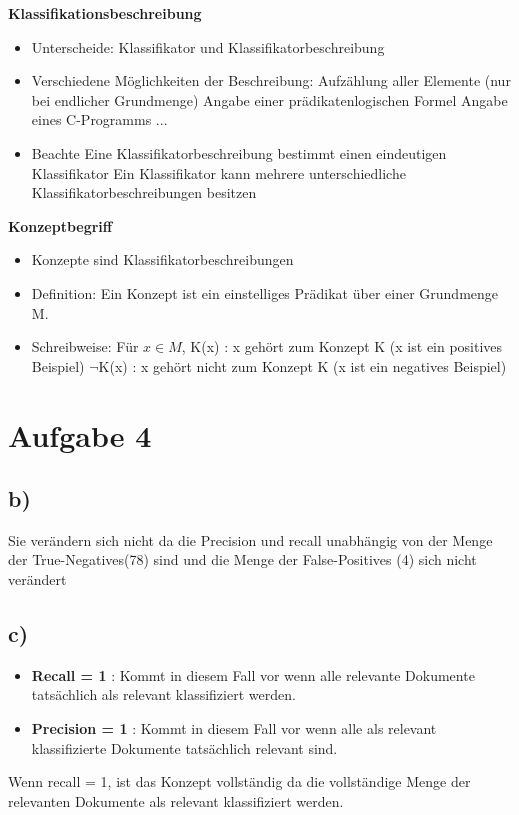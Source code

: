 \documentclass[11pt,a4paper,parskip=half ]{scrartcl}
\begin{document}
			\textbf{Klassifikationsbeschreibung}
			\begin{itemize}
				\item Unterscheide: Klassifikator und Klassifikatorbeschreibung
				\item Verschiedene Möglichkeiten der Beschreibung:
					\subitem Aufzählung aller Elemente (nur bei endlicher Grundmenge)
					\subitem Angabe einer prädikatenlogischen Formel
					\subitem Angabe eines C-Programms
					\subitem ...
				\item Beachte
					\subitem Eine Klassifikatorbeschreibung bestimmt einen eindeutigen Klassifikator
					\subitem  Ein Klassifikator kann mehrere unterschiedliche Klassifikatorbeschreibungen besitzen 
			\end{itemize}
		
			\textbf{Konzeptbegriff}
			\begin{itemize}
				\item Konzepte sind Klassifikatorbeschreibungen
				\item Definition: Ein Konzept ist ein einstelliges Prädikat über einer Grundmenge M.
				\item Schreibweise:
					\subitem Für $x\in M$,  
					\subsubitem  K(x) : x gehört zum Konzept K (x ist ein positives Beispiel)
					\subsubitem $\neg$K(x) : x gehört nicht zum Konzept K (x ist ein negatives Beispiel)
			\end{itemize}
		
	
	\section*{Aufgabe 4}
	\subsection*{b)} Sie verändern sich nicht da die Precision und recall unabhängig von der Menge der True-Negatives(78) sind und die Menge der False-Positives (4) sich nicht verändert
	
	\subsection*{c)}
		\begin{itemize}
			\item[] \textbf{Recall = 1} : Kommt in diesem Fall vor wenn alle relevante Dokumente tatsächlich als relevant klassifiziert werden.
			\item[] \textbf{Precision = 1} : Kommt in diesem Fall vor wenn alle als relevant klassifizierte Dokumente tatsächlich relevant sind.
		\end{itemize}
	Wenn recall = 1, ist das Konzept vollständig da die vollständige Menge der relevanten Dokumente als relevant klassifiziert werden.
	
	
\end{document}
